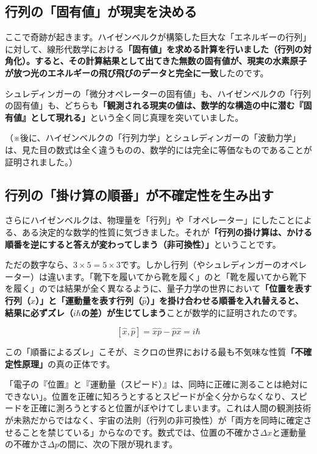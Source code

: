 \subsection{行列の「固有値」が現実を決める}

ここで奇跡が起きます。ハイゼンベルクが構築した巨大な「エネルギーの行列」に対して、線形代数学における\textbf{「固有値」を求める計算を行いました（行列の対角化）。すると、その計算結果として出てきた無数の固有値が、現実の水素原子が放つ光のエネルギーの飛び飛びのデータと完全に一致}したのです。

シュレディンガーの「微分オペレーターの固有値」も、ハイゼンベルクの「行列の固有値」も、どちらも\textbf{「観測される現実の値は、数学的な構造の中に潜む『固有値』として現れる」}という全く同じ真理を突いていました。

（※後に、ハイゼンベルクの「行列力学」とシュレディンガーの「波動力学」は、見た目の数式は全く違うものの、数学的には完全に等価なものであることが証明されました。）

\subsection{行列の「掛け算の順番」が不確定性を生み出す}

さらにハイゼンベルクは、物理量を「行列」や「オペレーター」にしたことによる、ある決定的な数学的性質に気づきました。それが\textbf{「行列の掛け算は、かける順番を逆にすると答えが変わってしまう（非可換性）」}ということです。

ただの数字なら、\(3 \times 5 = 5 \times 3\)です。しかし行列（やシュレディンガーのオペレーター）は違います。「靴下を履いてから靴を履く」のと「靴を履いてから靴下を履く」のでは結果が全く異なるように、量子力学の世界において\textbf{「位置を表す行列（\(\hat{x}\)）」と「運動量を表す行列（\(\hat{p}\)）」を掛け合わせる順番を入れ替えると、結果に必ずズレ（\(i\hbar\)の差）が生じてしまう}ことが数学的に証明されたのです。

\[[\hat{x},\hat{p}] = \hat{x}\hat{p} - \hat{p}\hat{x} = i\hbar\]

この「順番によるズレ」こそが、ミクロの世界における最も不気味な性質\textbf{「不確定性原理」}の真の正体です。

「電子の『位置』と『運動量（スピード）』は、同時に正確に測ることは絶対にできない」。位置を正確に知ろうとするとスピードが全く分からなくなり、スピードを正確に測ろうとすると位置がぼやけてしまいます。これは人間の観測技術が未熟だからではなく、宇宙の法則（行列の非可換性）が「両方を同時に確定させることを禁じている」からなのです。数式では、位置の不確かさ\(\Delta x\)と運動量の不確かさ\(\Delta p\)の間に、次の下限が現れます。

